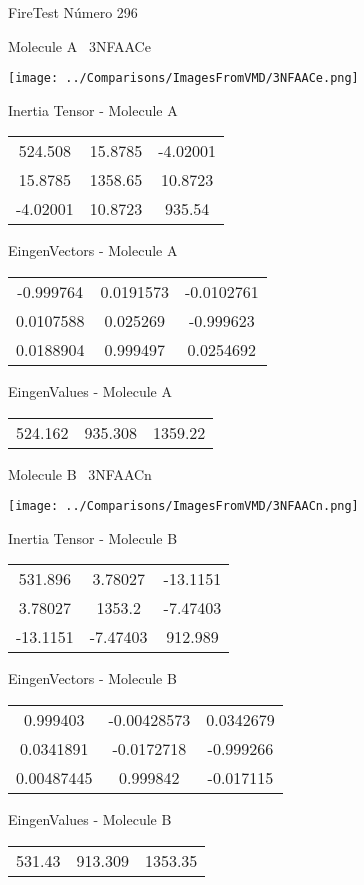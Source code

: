 \vtab[-3cm]
\begin{center}
{\large FireTest \tab Número 296}
\end{center}
\begin{multicols}{2}
\begin{center}

Molecule A \
3NFAACe

\texttt{[image: ../Comparisons/ImagesFromVMD/3NFAACe.png]}

Inertia Tensor - Molecule A \\
\begin{tabular}{|c c c|}
524.508	 & 	15.8785	 & 	-4.02001	 \\
15.8785	 & 	1358.65	 & 	10.8723	 \\
-4.02001	 & 	10.8723	 & 	935.54
\end{tabular}

\vtab
 EingenVectors - Molecule A     \\
\begin{tabular}{|c c c|}
-0.999764	 & 	0.0191573	 & 	-0.0102761	 \\
0.0107588	 & 	0.025269	 & 	-0.999623	 \\
0.0188904	 & 	0.999497	 & 	0.0254692
\end{tabular}

\vtab
 EingenValues - Molecule A     \\
\begin{tabular}{|c c c|}
524.162	 & 	935.308	 & 	1359.22	 \\
\end{tabular}
\columnbreak

Molecule B \
3NFAACn

\texttt{[image: ../Comparisons/ImagesFromVMD/3NFAACn.png]}

Inertia Tensor - Molecule B \\
\begin{tabular}{|c c c|}
531.896	 & 	3.78027	 & 	-13.1151	 \\
3.78027	 & 	1353.2	 & 	-7.47403	 \\
-13.1151	 & 	-7.47403	 & 	912.989
\end{tabular}

\vtab
 EingenVectors - Molecule B     \\
\begin{tabular}{|c c c|}
0.999403	 & 	-0.00428573	 & 	0.0342679	 \\
0.0341891	 & 	-0.0172718	 & 	-0.999266	 \\
0.00487445	 & 	0.999842	 & 	-0.017115
\end{tabular}

\vtab
 EingenValues - Molecule B     \\
\begin{tabular}{|c c c|}
531.43	 & 	913.309	 & 	1353.35	 \\
\end{tabular}

\end{center}
\end{multicols}

